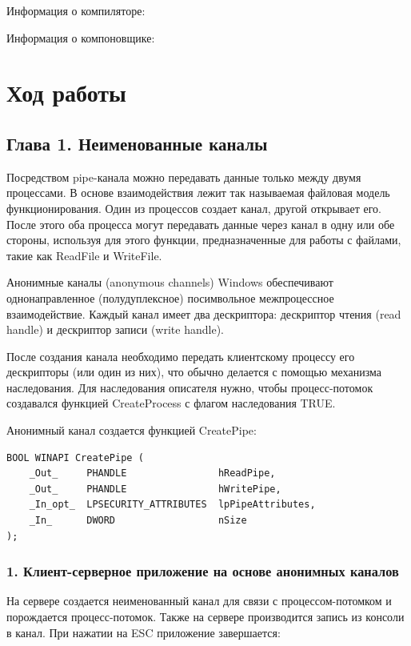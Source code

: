 \documentclass[14pt,a4paper,report]{report}
\begin{document}
Информация о компиляторе:



Информация о компоновщике:



\section{Ход работы}

\subsection{Глава 1. Неименованные каналы}

Посредством pipe-канала можно передавать данные только между двумя процессами. В основе взаимодействия лежит так называемая файловая модель функционирования. Один из процессов создает канал, другой открывает его. После этого оба процесса могут передавать данные через канал в одну или обе стороны, используя для этого функции, предназначенные для работы с файлами, такие как ReadFile и WriteFile.

Анонимные каналы (anonymous channels) Windows обеспечивают однонаправленное (полудуплексное) посимвольное межпроцессное взаимодействие. Каждый канал имеет два дескриптора: дескриптор чтения (read handle) и дескриптор записи (write handle).

После создания канала необходимо передать клиентскому процессу его дескрипторы (или один из них), что обычно делается с помощью механизма наследования. Для наследования описателя нужно, чтобы процесс-потомок создавался функцией CreateProcess с флагом наследования TRUE.

\clearpage

Анонимный канал создается функцией CreatePipe:

\begin{verbatim}
BOOL WINAPI CreatePipe (
    _Out_     PHANDLE                hReadPipe,
    _Out_     PHANDLE                hWritePipe,
    _In_opt_  LPSECURITY_ATTRIBUTES  lpPipeAttributes,
    _In_      DWORD                  nSize
);
\end{verbatim}

\subsubsection{1. Клиент-серверное приложение на основе анонимных каналов}

На сервере создается неименованный канал для связи с процессом-потомком и порождается процесс-потомок. Также на сервере производится запись из консоли в канал. При нажатии на ESC приложение завершается:
\end{document}
